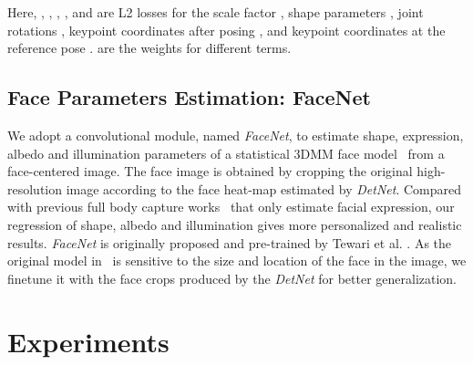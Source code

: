 \documentclass[final]{cvpr}
\begin{document}
Here, , , , , and  are L2 losses for the scale factor , shape parameters , joint rotations , keypoint coordinates after posing , and keypoint coordinates at the reference pose .
 are the weights for different terms.
 \subsection{Face Parameters Estimation: FaceNet}
\label{sec:FaceNet}
We adopt a convolutional module, named \textit{FaceNet}, to estimate shape, expression, albedo and illumination parameters of a statistical 3DMM face model~\cite{blanz1999a} from a face-centered image.
The face image is obtained by cropping the original high-resolution image according to the face heat-map estimated by \textit{DetNet}.
Compared with previous full body capture works~\cite{xiang2019monocular,pavlakos2019expressive,joo2018total,choutas2020monocular} that only estimate facial expression, our regression of shape, albedo and illumination gives more personalized and realistic results.
\textit{FaceNet} is originally proposed and pre-trained by Tewari et al. \cite{tewari2017mofa}.
As the original model in~\cite{tewari2017mofa} is sensitive to the size and location of the face in the image, we finetune it with the face crops produced by the \textit{DetNet} for better generalization.
  \section{Experiments}
\end{document}
